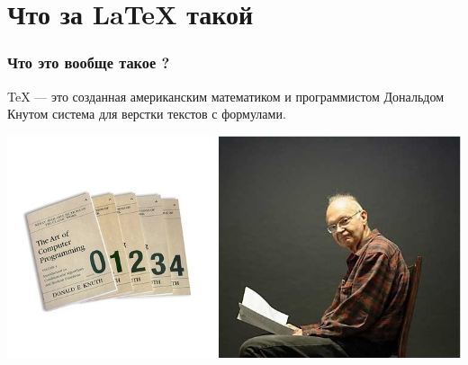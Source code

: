 \documentclass[aspectratio=169,newPxFont]{beamer}
\begin{document}
\section{Что за \LaTeX{} такой}


\begin{frame}
\frametitle{Что это вообще такое ?}
\alert{TeX} —  это созданная американским математиком и программистом Дональдом Кнутом система для верстки текстов с формулами.

\centering \includegraphics[scale=0.5]{knut.jpg}\\
\end{frame}
\end{document}
